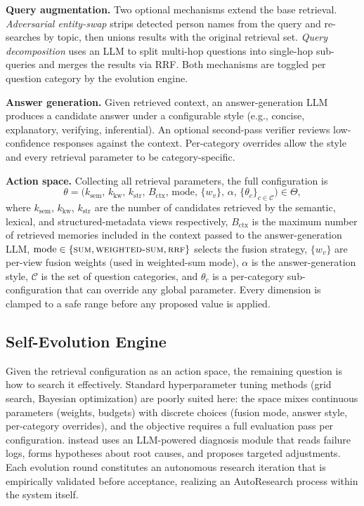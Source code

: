 \noindent \textbf{Query augmentation.} Two optional mechanisms extend the base retrieval. \emph{Adversarial entity-swap} strips detected person names from the query and re-searches by topic, then unions results with the original retrieval set. \emph{Query decomposition} uses an LLM to split multi-hop questions into single-hop sub-queries and merges the results via RRF. Both mechanisms are toggled per question category by the evolution engine.

\noindent \textbf{Answer generation.} Given retrieved context, an answer-generation LLM produces a candidate answer under a configurable style (e.g., concise, explanatory, verifying, inferential). An optional second-pass verifier reviews low-confidence responses against the context. Per-category overrides allow the style and every retrieval parameter to be category-specific.

\noindent \textbf{Action space.} Collecting all retrieval parameters, the full configuration is
\begin{equation}
    \theta = \bigl(k_{\text{sem}},\, k_{\text{kw}},\, k_{\text{str}},\, B_{\text{ctx}},\, \text{mode},\, \{w_v\},\, \alpha,\, \{\theta_c\}_{c\in\mathcal{C}}\bigr) \in \Theta,
    \label{eq:theta_space}
\end{equation}
where $k_{\text{sem}}$, $k_{\text{kw}}$, $k_{\text{str}}$ are the number of candidates retrieved by the semantic, lexical, and structured-metadata views respectively, $B_{\text{ctx}}$ is the maximum number of retrieved memories included in the context passed to the answer-generation LLM, $\text{mode} \in \{\textsc{sum}, \textsc{weighted-sum}, \textsc{rrf}\}$ selects the fusion strategy, $\{w_v\}$ are per-view fusion weights (used in weighted-sum mode), $\alpha$ is the answer-generation style, $\mathcal{C}$ is the set of question categories, and $\theta_c$ is a per-category sub-configuration that can override any global parameter. Every dimension is clamped to a safe range before any proposed value is applied.

\subsection{Self-Evolution Engine}
\label{sec:evolution_engine}

Given the retrieval configuration as an action space, the remaining question is how to search it effectively. Standard hyperparameter tuning methods (grid search, Bayesian optimization) are poorly suited here: the space mixes continuous parameters (weights, budgets) with discrete choices (fusion mode, answer style, per-category overrides), and the objective requires a full evaluation pass per configuration. \ours{} instead uses an LLM-powered diagnosis module that reads failure logs, forms hypotheses about root causes, and proposes targeted adjustments. Each evolution round constitutes an autonomous research iteration that is empirically validated before acceptance, realizing an AutoResearch process within the system itself.

